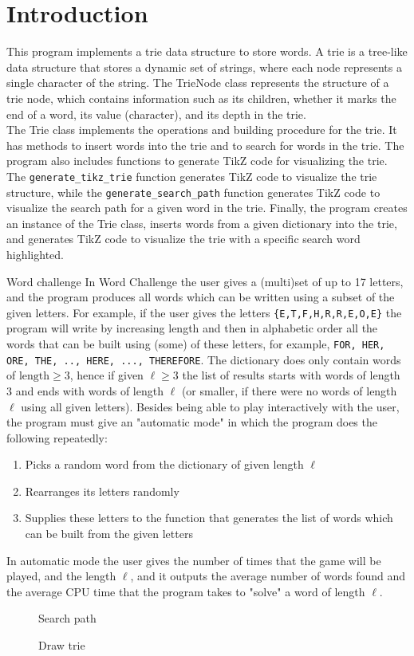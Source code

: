 \documentclass[10pt,a4paper,hidelinks]{report}
\begin{document}


\section{Introduction}


This program implements a trie data structure to store words.
A trie is a tree-like data structure that stores a dynamic set of strings, where each node represents a single character of the string.
The TrieNode class represents the structure of a trie node, which contains information such as its children, whether it marks the end of a word, its value (character), and its depth in the trie.\\

The Trie class implements the operations and building procedure for the trie. It has methods to insert words into the trie and to search for words in the trie.
The program also includes functions to generate TikZ code for visualizing the trie. The \verb|generate_tikz_trie| function generates TikZ code to visualize the trie structure, while the \verb|generate_search_path| function generates TikZ code to visualize the search path for a given word in the trie.
Finally, the program creates an instance of the Trie class, inserts words from a given dictionary into the trie, and generates TikZ code to visualize the trie with a specific search word highlighted.

\begin{exercise_description}{Word challenge}
    In Word Challenge the user gives a (multi)set of up to 17 letters, and the program produces all words which can be written using a subset of the given letters. For example, if the user gives the letters \verb|{E,T,F,H,R,R,E,O,E}| the program will write by increasing length and then in alphabetic order all the words that can be built using (some) of these letters, for example, \verb|FOR, HER, ORE, THE, .., HERE, ..., THEREFORE|. The dictionary does only contain words of $\text{length}\geqslant  3$, hence if given $\ell \geqslant 3$ the list of results starts with words of length 3 and ends with words of length $\ell$ (or smaller, if there were no words of length $\ell$ using all given letters). Besides being able to play interactively with the user, the program must give an "automatic mode" in which the program does the following repeatedly:
    \begin{enumerate}
    \item Picks a random word from the dictionary of given length $\ell$
    \item Rearranges its letters randomly
    \item Supplies these letters to the function that generates the list of words which can be built from the given letters
    \end{enumerate}
    In automatic mode the user gives the number of times that the game will be played, and the length $\ell$, and it outputs the average number of words found and the average CPU time that the program takes to "solve" a word of length $\ell$.
\end{exercise_description}

\begin{figure}[h]
    \centering
    
    \caption{Search path}
    \label{fig:search_path_pgm}
\end{figure}

\begin{figure}[h]
    \centering
    
    \caption{Draw trie}
    \label{fig:draw_pgm}
\end{figure}
\end{document}
